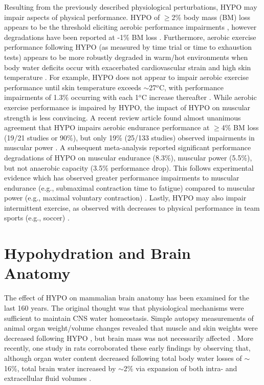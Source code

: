 Resulting from the previously described physiological perturbations, HYPO may impair aspects of physical performance. HYPO of ${\geq}$2\% body mass (BM) loss appears to be the threshold eliciting aerobic performance impairments \cite{sawka_hypohydration_2015}, however degradations have been reported at -1\% BM loss \cite{bardis_mild_2013}. Furthermore, aerobic exercise performance following HYPO (as measured by time trial or time to exhaustion tests) appears to be more robustly degraded in warm/hot environments \cite{sawka_human_1992,cheuvront_mechanisms_2010,ebert_influence_2007} when body water deficits occur with exacerbated cardiovascular strain \cite{costill_plasma_1974,cheuvront_mechanisms_2010} and high skin temperature \cite{sawka_high_2012}. For example, HYPO does not appear to impair aerobic exercise performance until skin temperature exceeds ${\sim}$27${^o}$C, with performance impairments of 1.3\% occurring with each 1${^o}$C increase thereafter \cite{sawka_high_2012,kenefick_skin_2010}. While aerobic exercise performance is impaired by HYPO, the impact of HYPO on muscular strength is less convincing. A recent review article found almost unanimous agreement that HYPO impairs aerobic endurance performance at ${\geq}$4\% BM loss (19/21 studies or 90\%), but only 19\% (25/133 studies) observed impairments in muscular power \cite{cheuvront_dehydration:_2014}. A subsequent meta-analysis \cite{savoie_effect_2015} reported significant performance degradations of HYPO on muscular endurance (8.3\%), muscular power (5.5\%), but not anaerobic capacity (3.5\% performance drop). This follows experimental evidence which has observed greater performance impairments to muscular endurance (e.g., submaximal contraction time to fatigue) compared to muscular power (e.g., maximal voluntary contraction) \cite{bigard_effects_2001}. Lastly, HYPO may also impair intermittent exercise, as observed with decreases to physical performance in team sports (e.g., soccer) \cite{nuccio_fluid_2017}.      


\section{Hypohydration and Brain Anatomy}
The effect of HYPO on mammalian brain anatomy has been examined for the last 160 years. The original thought was that physiological mechanisms were sufficient to maintain CNS water homeostasis. Simple autopsy measurements of animal organ weight/volume changes revealed that muscle and skin weights were decreased following HYPO \cite{nothwang_folgen_1892,falck_untersuchungen_1854,schiff_experimentelle_1925}, but brain mass was not necessarily affected \cite{falck_untersuchungen_1854}. More recently, one study in rats corroborated these early findings by observing that, although organ water content decreased following total body water losses of ${\sim}$16\%, total brain water increased by ${\sim}$2\% via expansion of both intra- and extracellular fluid volumes \cite{nose_distribution_1983}. 

